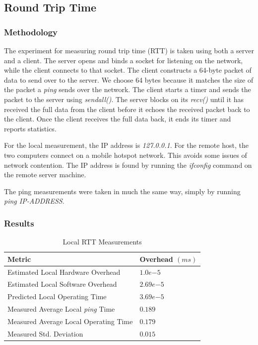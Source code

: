 \documentclass[sigconf]{acmart}
\begin{document}
\subsection{Round Trip Time}
\subsubsection{Methodology}
The experiment for measuring round trip time (RTT) is taken using both a server and a client. The server opens and binds a socket for listening on the network, while the client connects to that socket. The client constructs a 64-byte packet of data to send over to the server. We choose 64 bytes because it matches the size of the packet a \textit{ping} sends over the network. The client starts a timer and sends the packet to the server using \textit{sendall()}. The server blocks on its \textit{recv()} until it has received the full data from the client before it echoes the received packet back to the client. Once the client receives the full data back, it ends its timer and reports statistics.

For the local measurement, the IP address is \textit{127.0.0.1}. For the remote host, the two computers connect on a mobile hotspot network. This avoids some issues of network contention. The IP address is found by running the \textit{ifconfig} command on the remote server machine.

The ping measurements were taken in much the same way, simply by running \textit{ping IP-ADDRESS}.

\subsubsection{Results}
\begin{table}[h!]
\centering
\caption{Local RTT Measurements}
\label{LocalRTTMeasurements}
\begin{tabular}{|l|l|}
\hline
\textbf{Metric}								& \textbf{Overhead $(ms)$}	\\ \hline
Estimated Local Hardware Overhead			& $1.0 e{-5}$				\\ \hline
Estimated Local Software Overhead			& $2.69 e{-5}$				\\ \hline
Predicted Local Operating Time				& $3.69 e{-5}$				\\ \hline
Measured Average Local \textit{ping} Time	& $0.189$					\\ \hline
Measured Average Local Operating Time		& $0.179$					\\ \hline
Measured Std. Deviation						& $0.015$					\\ \hline
\end{tabular}
\end{table}
\end{document}
